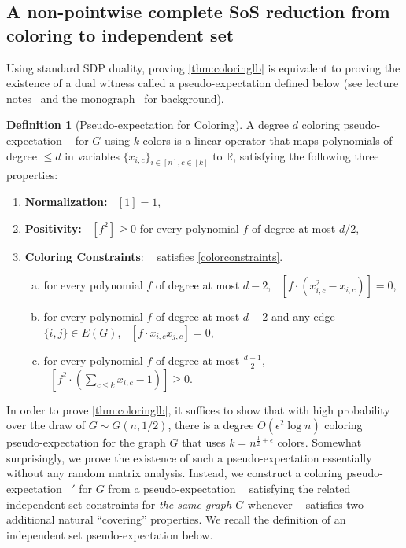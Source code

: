 \documentclass[10pt,a4paper]{article}
\theoremstyle{definition}
\newtheorem{definition}[theorem]{Definition}
\newcommand{\R}{\mathbb R}
\newcommand{\eps}{\epsilon}
\DeclareMathOperator{\pE}{\tilde{\mathbb{E}}}
\newcommand{\numcolors}{k}
\begin{document}
\subsection{A non-pointwise complete SoS reduction from coloring to independent set} 
Using standard SDP duality, proving \cref{thm:coloringlb} is equivalent to proving the existence of a dual witness called a pseudo-expectation defined below (see lecture notes~\cite{BarakS16} and the monograph~\cite{TCS-086} for background). 

\begin{definition}[Pseudo-expectation for Coloring]
A degree $d$ coloring pseudo-expectation $\pE$ for $G$ using $\numcolors$ colors is a linear operator that maps polynomials of degree $\leq d$ in variables $\{x_{i,c}\}_{ i \in [n], c \in [k]}$ to $\R$, satisfying the following three properties:
\begin{enumerate}
	\item \textbf{Normalization: } $\pE[1]  = 1$,
	\item \textbf{Positivity: } $\pE[f^2] \geq 0$ for every polynomial $f$ of degree at most $d/2$,
	\item \textbf{Coloring Constraints}: $\pE$ satisfies \cref{colorconstraints}. \begin{enumerate}[(a)] 
	\item for every polynomial $f$ of degree at most $d-2$, $\pE[f \cdot (x_{i,c}^2 - x_{i,c})] = 0$,
	\item for every polynomial $f$ of degree at most $d-2$ and any edge $\{i, j\} \in E(G)$, $\pE[f \cdot x_{i,c} x_{j,c}] = 0$,
	 \item for every polynomial $f$ of degree at most $\frac{d-1}{2}$, $\pE[f^2 \cdot (\sum_{c \leq k} x_{i,c} -1)] \geq 0$. 
	\end{enumerate}
	\end{enumerate}
\end{definition}
In order to prove \cref{thm:coloringlb}, it suffices to show that with high probability over the draw of $G \sim G(n,1/2)$, there is a degree $O(\eps^2 \log n)$ coloring pseudo-expectation for the graph $G$ that uses $\numcolors = n^{\frac{1}{2}+ \eps}$ colors. Somewhat surprisingly, we prove the existence of such a pseudo-expectation essentially without any random matrix analysis. Instead, we construct a coloring pseudo-expectation $\pE'$ for $G$ from a pseudo-expectation $\pE$ satisfying the related independent set constraints for \emph{the same graph $G$} whenever $\pE$ satisfies two additional natural ``covering'' properties. We recall the definition of an independent set pseudo-expectation below.
\end{document}
